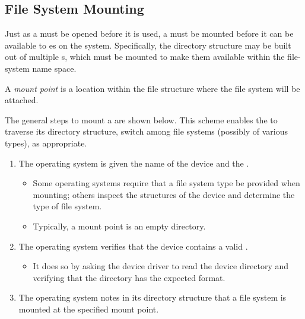 \subsection{File System Mounting}\label{subsec:File_System_Mounting}
Just as a  must be opened before it is used, a  must be mounted before it can be available to es on the system.
Specifically, the directory structure may be built out of multiple s, which must be mounted to make them available within the file-system name space.

\begin{definition}\label{def:Mount_Point}
  A \emph{mount point} is a location within the file structure where the file system will be attached.
\end{definition}

The general steps to mount a  are shown below.
This scheme enables the  to traverse its directory structure, switch among file systems (possibly of various types), as appropriate.
\begin{enumerate}[noitemsep]
\item The operating system is given the name of the device and the .
  \begin{itemize}[noitemsep]
  \item Some operating systems require that a file system type be provided when mounting; others inspect the structures of the device and determine the type of file system.
  \item Typically, a mount point is an empty directory.
  \end{itemize}

\item The operating system verifies that the device contains a valid .
  \begin{itemize}[noitemsep]
  \item It does so by asking the device driver to read the device directory
and verifying that the directory has the expected format.
\end{itemize}

\item The operating system notes in its directory structure that a file system is mounted at the specified mount point.
\end{enumerate}

